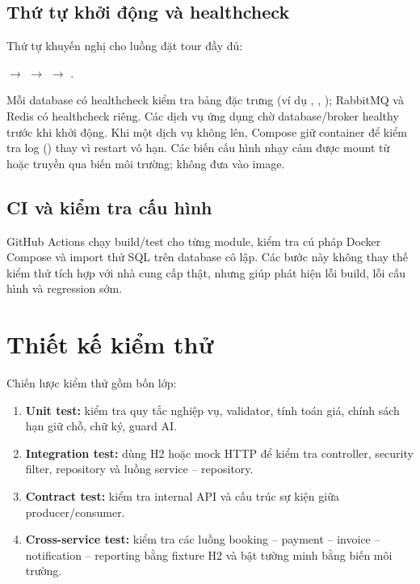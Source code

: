\subsection{Thứ tự khởi động và healthcheck}

Thứ tự khuyến nghị cho luồng đặt tour đầy đủ:

\begin{center}
 \(\rightarrow\)  \(\rightarrow\)  \(\rightarrow\) .
\end{center}

Mỗi database có healthcheck kiểm tra bảng đặc trưng (ví dụ , , ); RabbitMQ và Redis có healthcheck riêng. Các dịch vụ ứng dụng chờ database/broker healthy trước khi khởi động. Khi một dịch vụ không lên, Compose giữ container để kiểm tra log () thay vì restart vô hạn. Các biến cấu hình nhạy cảm được mount từ  hoặc truyền qua biến môi trường; không đưa vào image.

\subsection{CI và kiểm tra cấu hình}

GitHub Actions chạy build/test cho từng module, kiểm tra cú pháp Docker Compose và import thử SQL trên database cô lập. Các bước này không thay thế kiểm thử tích hợp với nhà cung cấp thật, nhưng giúp phát hiện lỗi build, lỗi cấu hình và regression sớm.

\section{Thiết kế kiểm thử}
\label{sec:kiem-thu}

Chiến lược kiểm thử gồm bốn lớp:

\begin{enumerate}
  \item \textbf{Unit test:} kiểm tra quy tắc nghiệp vụ, validator, tính toán giá, chính sách hạn giữ chỗ, chữ ký, guard AI.
  \item \textbf{Integration test:} dùng H2 hoặc mock HTTP để kiểm tra controller, security filter, repository và luồng service -- repository.
  \item \textbf{Contract test:} kiểm tra internal API và cấu trúc sự kiện giữa producer/consumer.
  \item \textbf{Cross-service test:} kiểm tra các luồng booking -- payment -- invoice -- notification -- reporting bằng fixture H2 và bật tường minh bằng biến môi trường.
\end{enumerate}

